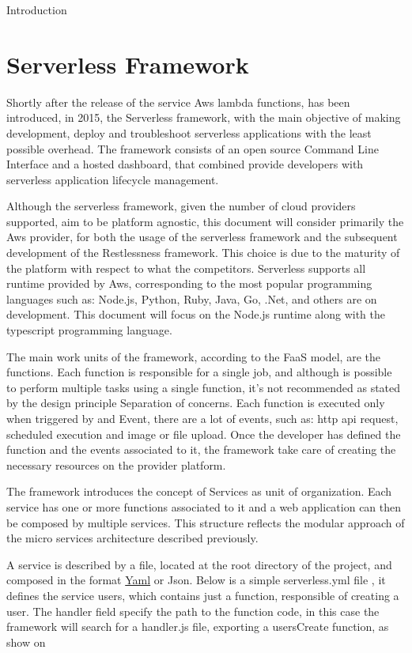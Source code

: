 \begin{chapter}{Introduction}
    \section{Serverless Framework}
    Shortly after the release of the service Aws lambda functions, has been introduced,
    in 2015, the Serverless framework, with the main objective of making development,
    deploy and troubleshoot serverless applications with the least possible overhead.
    The framework consists of an open source Command Line Interface and a hosted
    dashboard, that combined provide developers with serverless application lifecycle
    management.

    Although the serverless framework, given the number of cloud providers supported,
    aim to be platform agnostic, this document will consider primarily the Aws provider,
    for both the usage of the serverless framework and the subsequent development of
    the Restlessness framework. This choice is due to the maturity of the platform with
    respect to what the competitors.
    Serverless supports all runtime provided by Aws, corresponding to the most popular
    programming languages such as: Node.js, Python, Ruby, Java, Go, .Net, and others
    are on development.
    This document will focus on the Node.js runtime along with the typescript
    programming language.

    The main work units of the framework, according to the FaaS model, are the functions.
    Each function is responsible for a single job, and although is possible to perform
    multiple tasks using a single function, it's not recommended as stated by the design
    principle Separation of concerns.
    Each function is executed only when triggered by and Event, there are a lot of events,
    such as: http api request, scheduled execution and image or file upload.
    Once the developer has defined the function and the events associated to it,
    the framework take care of creating the necessary resources on the provider platform.

    The framework introduces the concept of Services as unit of organization. Each service
    has one or more functions associated to it and a web application can then be composed
    by multiple services. This structure reflects the modular approach of the micro services
    architecture described previously.

    A service is described by a file, located at the root directory of the project, and
    composed in the format \href{https://yaml.org/}{Yaml} or Json.
    Below is a simple serverless.yml file %
    , it defines the service users, which
    contains just a function, responsible of creating a user. The handler field specify
    the path to the function code, in this case the framework will search for a handler.js file,
    exporting a usersCreate function, as show on %


\end{chapter}

